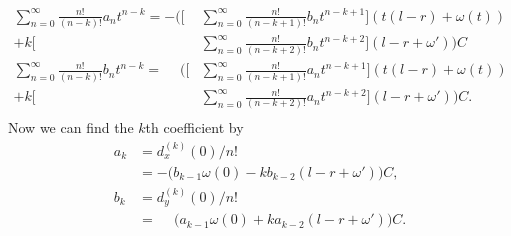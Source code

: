 \documentclass{report}
\begin{document}
\begin{equation} \label{eq:diffk}
    \begin{aligned}
    \sum_{n=0}^\infty \frac{n!}{(n-k)!} a_n t^{n-k} =
        -\Bigg(\Bigg[&\sum_{n=0}^\infty \frac{n!}{(n-k+1)!} b_n t^{n-k+1} \Bigg]
             (t(l-r)+\omega(t))
                \\
                +k\Bigg[&\sum_{n=0}^\infty \frac{n!}{(n-k+2)!} b_n t^{n-k+2} \Bigg]
                (l - r + \omega')\Bigg)C\\
    \sum_{n=0}^\infty \frac{n!}{(n-k)!} b_n t^{n-k} =
        \phantom{-}\Bigg(\Bigg[&\sum_{n=0}^\infty \frac{n!}{(n-k+1)!} a_n t^{n-k+1} \Bigg]
             (t(l-r)+\omega(t))
                \\
                + k\Bigg[&\sum_{n=0}^\infty \frac{n!}{(n-k+2)!} a_n t^{n-k+2} \Bigg]
                (l - r + \omega')\Bigg)C.\\
    \end{aligned}
\end{equation}
Now we can find the $k$th coefficient by
\begin{equation}
    \begin{aligned}
        a_k &= d_x^{(k)}(0)/n! \\
            &= -\big(b_{k-1} \omega(0) - k b_{k-2} (l - r + \omega')\big)C,\\
        b_k &= d_y^{(k)}(0)/n! \\
            &= \phantom{-}\big(a_{k-1} \omega(0) + k a_{k-2} (l - r + \omega')\big)C.
    \end{aligned}
\end{equation}
\end{document}
